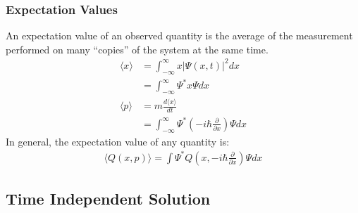 \documentclass[11pt]{article}
\newcommand{\cc}[1]{\ensuremath{#1^{\ast}}}			%
\newcommand{\pd}[2]{
\ensuremath{ \frac{\partial #1}{\partial #2} }}			%
\begin{document}
\begin{multicols*}{3}
\subsubsection{Expectation Values}
An expectation value of an observed quantity is the average of the measurement performed on many ``copies'' of the system at the same time.
	\begin{align*}
	\langle x\rangle &= \int_{-\infty}^{\infty} x |\Psi(x,t)|^2 dx \\
	&= \int_{-\infty}^{\infty} \cc{\Psi} x \Psi dx \\
	\langle p\rangle &= m\frac{d\langle x\rangle}{dt} \\
	&= \int_{-\infty}^{\infty} \cc{\Psi} \left( -i\hbar \pd{}{x} \right) \Psi dx
	\end{align*}
In general, the expectation value of any quantity is:
	\begin{align*}
	\langle Q(x, p) \rangle = \int \cc{\Psi} Q\left(x, -i\hbar\pd{}{x} \right) \Psi dx
	\end{align*}

\subsection{Time Independent Solution}

\end{multicols*}
\end{document}
